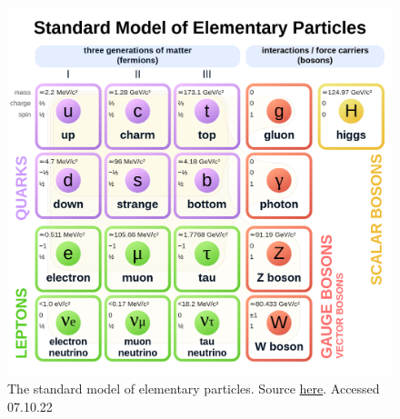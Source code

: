 
\begin{figure}[h!]
    \includegraphics[width=\linewidth]{Figures/SM/Standard_Model_of_Elementary_Particles.svg.png}
    \caption[The Standard Model]{The standard model of elementary particles. Source \href{https://upload.wikimedia.org/wikipedia/commons/thumb/0/00/Standard_Model_of_Elementary_Particles.svg/1200px-Standard_Model_of_Elementary_Particles.svg.png}{here}. Accessed 07.10.22}
    \label{fig:smdiagram}
\end{figure}


